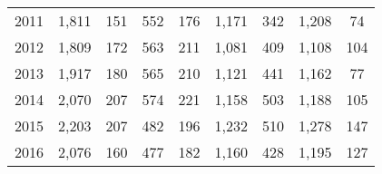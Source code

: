 \begin{table}[htbp]
\begin{tabular}{l*{8}{c}}
2011      &    1,811&      151&      552&      176&    1,171&      342&    1,208&       74\\
2012      &    1,809&      172&      563&      211&    1,081&      409&    1,108&      104\\
2013      &    1,917&      180&      565&      210&    1,121&      441&    1,162&       77\\
2014      &    2,070&      207&      574&      221&    1,158&      503&    1,188&      105\\
2015      &    2,203&      207&      482&      196&    1,232&      510&    1,278&      147\\
2016      &    2,076&      160&      477&      182&    1,160&      428&    1,195&      127\\
\hline\hline
\end{tabular}
\end{table}
